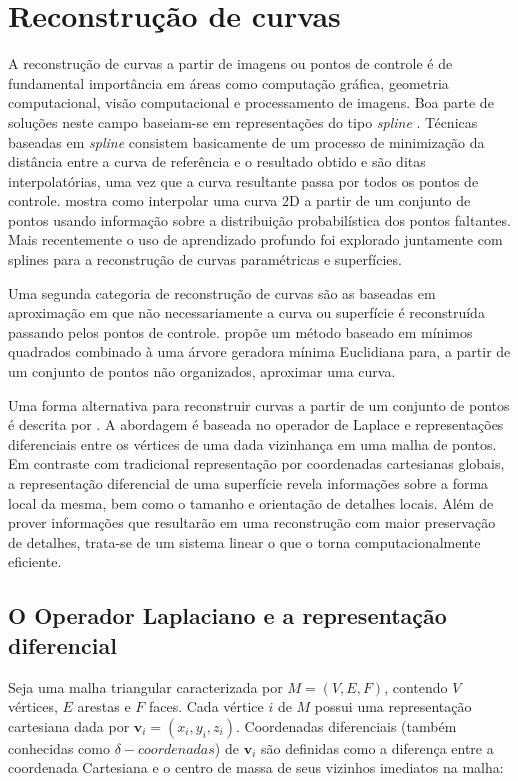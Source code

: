 \documentclass[
	12pt,				%
	oneside,			%
	a4paper,			%
	sumario=tradicional,
	english,			%
	french,				%
	spanish,			%
	brazil,				%
]{abntex2}
\begin{document}
\section{Reconstrução de curvas}

A reconstrução de curvas a partir de imagens ou pontos de controle é de fundamental importância em áreas como computação gráfica, geometria computacional, visão computacional e processamento de imagens. Boa parte de soluções neste campo baseiam-se em representações do tipo \emph{spline} \cite{Schoenberg1946}. Técnicas baseadas em \emph{spline} consistem basicamente de um processo de minimização da distância entre a curva de referência e o resultado obtido e são ditas interpolatórias, uma vez que a curva resultante passa por todos os pontos de controle.  mostra como interpolar uma curva 2D a partir de um conjunto de pontos usando informação sobre a distribuição probabilística dos pontos faltantes. Mais recentemente \cite{DeepSpline} o uso de aprendizado profundo foi explorado juntamente com splines para a reconstrução de curvas paramétricas e superfícies. 

Uma segunda categoria de reconstrução de curvas são as baseadas em aproximação em que não necessariamente a curva ou superfície é reconstruída passando pelos pontos de controle.  propõe um método baseado em mínimos quadrados combinado à uma árvore geradora mínima Euclidiana para, a partir de um conjunto de pontos não organizados, aproximar uma curva. 


Uma forma alternativa para reconstruir curvas a partir de um conjunto de pontos é descrita por . A abordagem é baseada no operador de Laplace e representações diferenciais entre os vértices de uma dada vizinhança em uma malha de pontos. Em contraste com tradicional representação por coordenadas cartesianas globais, a representação diferencial de uma superfície revela informações sobre a forma local da mesma, bem como o tamanho e orientação de detalhes locais. Além de prover informações que resultarão em uma reconstrução com maior preservação de detalhes, trata-se de um sistema linear o que o torna computacionalmente eficiente.

\subsection{O Operador Laplaciano e a representação diferencial}


Seja uma malha triangular caracterizada por $M = (V,E,F)$, contendo $V$ vértices, $E$ arestas e $F$ faces. Cada vértice $i$ de $M$ possui uma representação cartesiana dada por $\mathbf{v}_i = (x_i,y_i,z_i)$. Coordenadas diferenciais (também conhecidas como $\delta-coordenadas$) de $\mathbf{v}_i$ são definidas como a diferença entre a coordenada Cartesiana e o centro de massa de seus vizinhos imediatos na malha:
\end{document}
